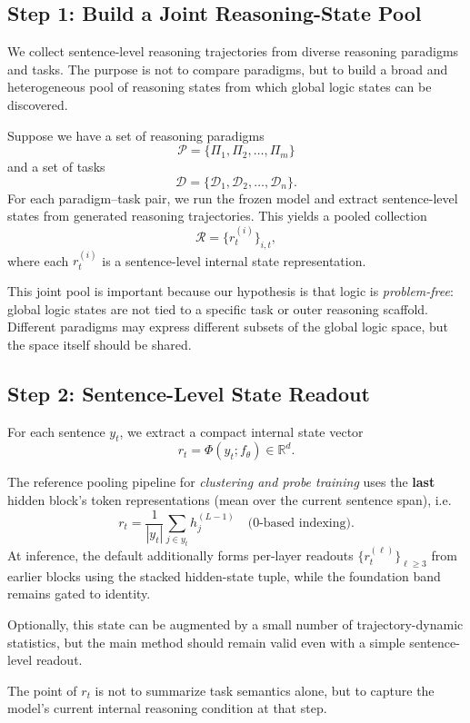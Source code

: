 \documentclass[11pt]{article}
\begin{document}
\subsection{Step 1: Build a Joint Reasoning-State Pool}

We collect sentence-level reasoning trajectories from diverse reasoning paradigms and tasks. The purpose is not to compare paradigms, but to build a broad and heterogeneous pool of reasoning states from which global logic states can be discovered.

Suppose we have a set of reasoning paradigms
\[
\mathcal{P} = \{\Pi_1,\Pi_2,\dots,\Pi_m\}
\]
and a set of tasks
\[
\mathcal{D} = \{\mathcal{D}_1,\mathcal{D}_2,\dots,\mathcal{D}_n\}.
\]
For each paradigm--task pair, we run the frozen model and extract sentence-level states from generated reasoning trajectories. This yields a pooled collection
\[
\mathcal{R} = \{r_t^{(i)}\}_{i,t},
\]
where each $r_t^{(i)}$ is a sentence-level internal state representation.

This joint pool is important because our hypothesis is that logic is \emph{problem-free}: global logic states are not tied to a specific task or outer reasoning scaffold. Different paradigms may express different subsets of the global logic space, but the space itself should be shared.

\subsection{Step 2: Sentence-Level State Readout}

For each sentence $y_t$, we extract a compact internal state vector
\[
r_t = \Phi(y_t; f_\theta)\in\mathbb{R}^d.
\]

The reference pooling pipeline for \emph{clustering and probe training} uses the \textbf{last} hidden block's token representations (mean over the current sentence span), i.e.
\[
r_t = \frac{1}{|y_t|}\sum_{j\in y_t} h_j^{(L-1)} \quad\text{(0-based indexing)}.
\]
At inference, the default additionally forms per-layer readouts $\{r_t^{(\ell)}\}_{\ell\ge 3}$ from earlier blocks using the stacked hidden-state tuple, while the foundation band remains gated to identity.

Optionally, this state can be augmented by a small number of trajectory-dynamic statistics, but the main method should remain valid even with a simple sentence-level readout.

The point of $r_t$ is not to summarize task semantics alone, but to capture the model's current internal reasoning condition at that step.
\end{document}
